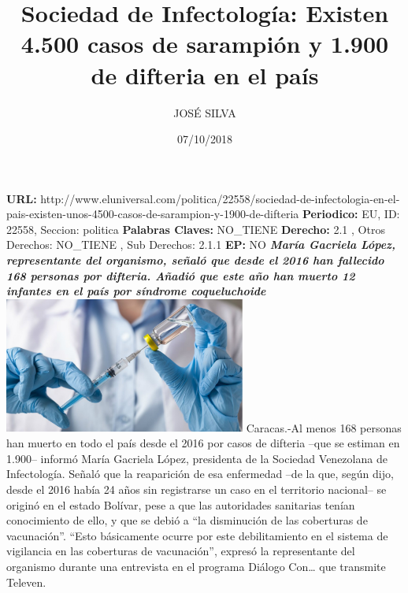 \documentclass{article}%
\title{\textbf{Sociedad de Infectología: Existen 4.500 casos de sarampión y 1.900 de difteria en el país}}%
\author{JOSÉ SILVA}%
\date{07/10/2018}%
\begin{document}
%
\normalsize%
\maketitle%
\textbf{URL: }%
http://www.eluniversal.com/politica/22558/sociedad{-}de{-}infectologia{-}en{-}el{-}pais{-}existen{-}unos{-}4500{-}casos{-}de{-}sarampion{-}y{-}1900{-}de{-}difteria\newline%
%
\textbf{Periodico: }%
EU, %
ID: %
22558, %
Seccion: %
politica\newline%
%
\textbf{Palabras Claves: }%
NO\_TIENE\newline%
%
\textbf{Derecho: }%
2.1%
, Otros Derechos: %
NO\_TIENE%
, Sub Derechos: %
2.1.1%
\newline%
%
\textbf{EP: }%
NO\newline%
\newline%
%
\textbf{\textit{María Gacriela López, representante del organismo, señaló que desde el 2016 han fallecido 168 personas por difteria. Añadió que este año han muerto 12 infantes en el país por síndrome coqueluchoide}}%
\newline%
\newline%
%
\includegraphics[width=300px]{227.jpg}%
\newline%
%
Caracas.{-}Al menos 168 personas han muerto en todo el país desde el 2016 por casos de difteria –que se estiman en 1.900– informó María Gacriela López, presidenta de la Sociedad Venezolana de Infectología.%
\newline%
%
Señaló que la reaparición de esa enfermedad –de la que, según dijo, desde el 2016 había 24 años sin registrarse un caso en el territorio nacional– se originó en el estado Bolívar, pese a que las autoridades sanitarias tenían conocimiento de ello, y que se debió a “la disminución de las coberturas de vacunación”.%
\newline%
%
“Esto básicamente ocurre por este debilitamiento en el sistema de vigilancia en las coberturas de vacunación”, expresó la representante del organismo durante una entrevista en el programa Diálogo Con… que transmite Televen.%
\newline%
\end{document}
